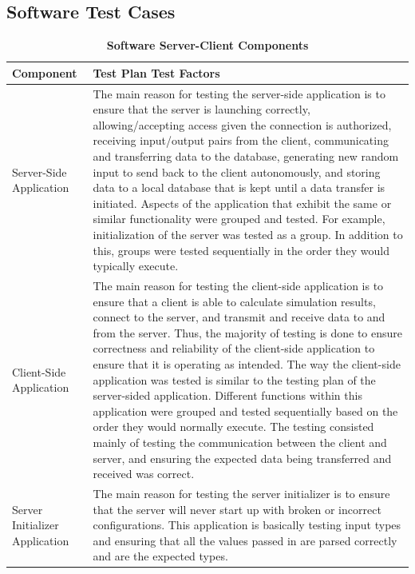 \documentclass[12pt, titlepage]{article}
\begin{document}
\subsection{Software Test Cases}
\begin{center}
\begin{table}[H]
\centering
\begin{tabular}{ |p{5cm}|p{10cm}|  } 
 \hline
\bf Component & \bf Test Plan Test Factors\\
\hline
 Server-Side Application & The main reason for testing the server-side application is to ensure that the server is launching correctly, allowing/accepting access given the connection is authorized, receiving input/output pairs from the client, communicating and transferring data to the database, generating new random input to send back to the client autonomously, and storing data to a local database that is kept until a data transfer is initiated. Aspects of the application that exhibit the same or similar functionality were grouped and tested. For example, initialization of the server was tested as a group. In addition to this, groups were tested sequentially in the order they would typically execute.\\
\hline
Client-Side Application & The main reason for testing the client-side application is to ensure that a client is able to calculate simulation results, connect to the server, and transmit and receive data to and from the server. Thus, the majority of testing is done to ensure correctness and reliability of the client-side application to ensure that it is operating as intended. The way the client-side application was tested is similar to the testing plan of the server-sided application. Different functions within this application were grouped and tested sequentially based on the order they would normally execute. The testing consisted mainly of testing the communication between the client and server, and ensuring the expected data being transferred and received was correct.\\
\hline
Server Initializer Application & The main reason for testing the server initializer is to ensure that the server will never start up with broken or incorrect configurations. This application is basically testing input types and ensuring that all the values passed in are parsed correctly and are the expected types.\\
\hline
\end{tabular}
\caption{\bf Software Server-Client Components}
\label{tab:my_label}
\end{table}
\end{center}
\end{document}
